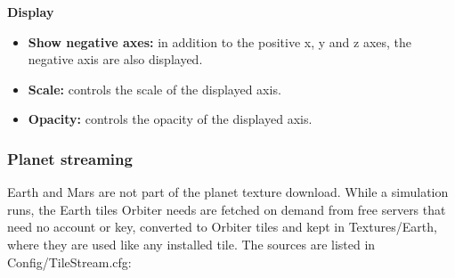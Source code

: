 \documentclass[Orbiter User Manual.tex]{subfiles}
\begin{document}
\noindent
\textbf{Display}
\begin{itemize}
\item \textbf{Show negative axes:} in addition to the positive x, y and z axes, the negative axis are also displayed.
\item \textbf{Scale:} controls the scale of the displayed axis.
\item \textbf{Opacity:} controls the opacity of the displayed axis.
\end{itemize}


\subsubsection{Planet streaming}
\label{sssec:launchpad_earth_streaming}
Earth and Mars are not part of the planet texture download. While a simulation runs, the Earth tiles Orbiter needs are fetched on demand from free servers that need no account or key, converted to Orbiter tiles and kept in Textures/Earth, where they are used like any installed tile. The sources are listed in Config/TileStream.cfg:
\end{document}

